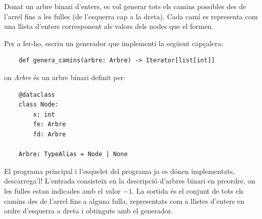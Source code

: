 
\UsePython

\Statement

Donat un arbre binari d'enters, es vol generar tots els camins possibles des de l'arrel fins a les fulles (de l'esquerra cap a la dreta). Cada camí es representa com una llista d'enters corresponent als valors dels nodes que el formen.

\medskip

Per a fer-ho, escriu un generador que implementi la següent capçalera:

\begin{lstlisting}
    def genera_camins(arbre: Arbre) -> Iterator[list[int]]
\end{lstlisting}

on \textit{Arbre} és un arbre binari definit per:

\begin{lstlisting}
    @dataclass
    class Node:
        x: int
        fe: Arbre
        fd: Arbre

    Arbre: TypeAlias = Node | None
\end{lstlisting}

\medskip

El programa principal i l'esquelet del programa ja es dónen implementats, descarrega'l! L'entrada consisteix en la descripció d'arbres binari en preordre, on les fulles estan indicades amb el valor $-1$. La sortida és el conjunt de tots els camins des de l'arrel fins a alguna fulla, representats com a llistes d'enters en ordre d'esquerra a dreta i obtinguts amb el generador.

\SampleOneCol

